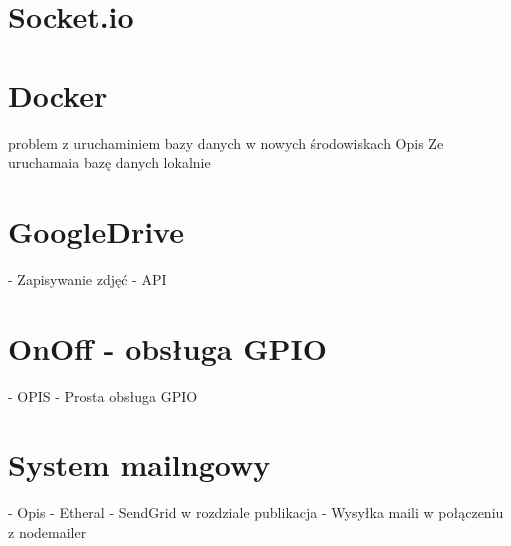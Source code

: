 \section{Socket.io}

\section{Docker}
problem z uruchaminiem bazy danych w nowych środowiskach
Opis
Ze uruchamaia bazę danych lokalnie

\section{GoogleDrive}
- Zapisywanie zdjęć
- API

\section{OnOff - obsługa GPIO}
- OPIS
- Prosta obsługa GPIO

\section{System mailngowy}
- Opis
- Etheral
- SendGrid w rozdziale publikacja
- Wysyłka maili w połączeniu z nodemailer